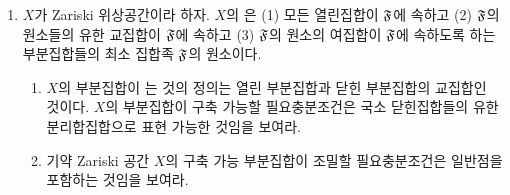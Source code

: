 \begin{enumerate}[label=\tb{3.\arabic*.},itemindent=0mm,itemsep=4mm]
	(b) 극소 비자명 닫힌집합 $D$가 2개 이상의 점을 가진다 하자.
	일반점의 유일성에 의해 일반점 이외의 임의의 점 $x$의 폐포는 $D$의 진부분집합이다. 이는 $D$의 극소성에 모순이다.\\
	(c) $T_0$ 공리가 성립하지 않는다면 어떠한 $x_0,x_1\in X,x_0\ne x_1$가 존재하여
	$x_0\in\overline{\{x_1\}}$이며 $x_1\in\overline{\{x_0\}}$이다.
	이 경우 $\overline{\{x_0\}}=\overline{\{x_1\}}$가 일반점 $x_0,x_1$을 가지므로 일반점의 유일성에 모순이다.\\
	(d) 비자명 열린집합 $V$가 존재하여 $X$의 일반점 $\xi$를 포함하지 않으면 $\overline{\{\xi\}}\bseq X-V$이므로 일반점임에 모순이다.\\
	(e) 폐포의 정의에 의해 점의 폐포는 기약 닫힌집합이며 기약 닫힌집합이 유일한 일반점을 가지므로
	특수화에 의한 부분순서는 기약 닫힌집합들의 포함 관계에 의한 부분순서와 순서동형이다. 닫힌점들이 극소원임은 자명하다.
	기약 닫힌집합들의 포함 관계에서의 극대원은 $X$의 기약 성분들이므로 이러한 집합의 일반점들이 특수화 하에서의 극대원이다.
	$D$가 닫힌집합이고 $x_1\in D$이며 $x_1\rightsquigarrow x_0$이면 $x_0\in\overline{\{x_1\}}\bseq D$이다.
	따라서 닫힌집합은 특수화 하에서 안정하다.
	$V$가 열린집합이고 $x_0\in V$이며 $x_1\rightsquigarrow x_0$라 하자.
	만약 $x_1\notin V$이면 $x_0\in\overline{\{x_1\}}\bseq X-V$이며 이는 $x_0\in V$임에 모순이다.
	따라서 열린집합은 일반화 하에서 안정하다.\\
	(f) $Y\bseq X$가 기약임과 $t(Y)\bseq t(X)$가 기약임이 동치이므로 $X$가 Noether라는 가정으로부터 $t(X)$가 Noether임이 따라온다.
	$t(X)$의 각각의 기약 닫힌 부분집합 $t(Y)$($Y$는 $X$의 기약 닫힌집합)가 유일한 일반점 $Y$를 가지므로 $t(X)$가 Zariski이다.
	(e)에서의 논의에 의해 Zariski 공간 $X$의 각 점은 기약 닫힌 부분집합과 일대일 대응하므로 $X$와 $t(X)$가 위상동형이다.
	역으로 Zariski 공간 $t(X)$와 $X$가 위상동형이면 $X$가 자명하게 Zariski이다.
	\item {} $X$가 Zariski 위상공간이라 하자. $X$의 은
	(1) 모든 열린집합이 $\mathfrak{F}$에 속하고 (2) $\mathfrak{F}$의 원소들의 유한 교집합이 $\mathfrak{F}$에 속하고
	(3) $\mathfrak{F}$의 원소의 여집합이 $\mathfrak{F}$에 속하도록 하는 부분집합들의 최소 집합족 $\mathfrak{F}$의 원소이다.
	\begin{enumerate}[label=(\alph*)]
	\item $X$의 부분집합이 는 것의 정의는 열린 부분집합과 닫힌 부분집합의 교집합인 것이다.
	$X$의 부분집합이 구축 가능할 필요충분조건은 국소 닫힌집합들의 유한 분리합집합으로 표현 가능한 것임을 보여라.
	\item 기약 Zariski 공간 $X$의 구축 가능 부분집합이 조밀할 필요충분조건은 일반점을 포함하는 것임을 보여라.

\end{enumerate}
\end{enumerate}
